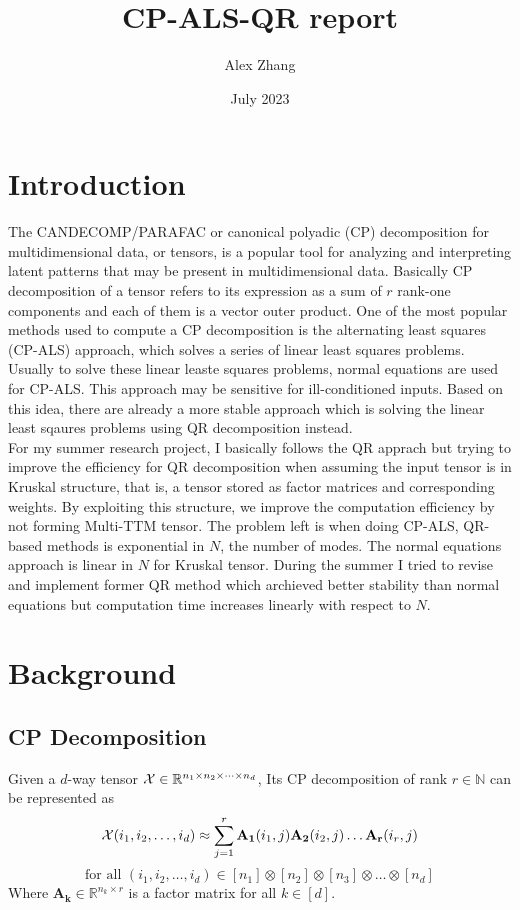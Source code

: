 \documentclass{article}
\title{CP-ALS-QR report}
\author{Alex Zhang}
\date{July 2023}
\newcommand{\mat}[1]{\mathbf{#1}}
\newcommand{\T}[2][]{#1{\mathbf{\cal{#2}}}} 						%
\begin{document}
\maketitle
\section{Introduction}
The CANDECOMP/PARAFAC or canonical polyadic (CP) decomposition for multidimensional data, 
or tensors, is a popular tool for analyzing and interpreting latent patterns that may be 
present in multidimensional data. Basically CP decomposition of a tensor refers to its
expression as a sum of $r$ rank-one components and each of them is a vector outer product.
One of the most popular methods used to compute a CP decomposition is the alternating least
squares (CP-ALS) approach, which solves a series of linear least squares problems. Usually
to solve these linear leaste squares problems, normal equations are used for CP-ALS. This
approach may be sensitive for ill-conditioned inputs. Based on this idea, there are already
a more stable approach which is solving the linear least sqaures problems using QR decomposition
instead.
\\
For my summer research project, I basically follows the QR apprach but trying to 
improve the efficiency for QR decomposition when assuming the input tensor is in Kruskal structure,
that is, a tensor stored as factor matrices and corresponding weights. By exploiting this structure, 
we improve the computation efficiency by not forming Multi-TTM tensor.
The problem left is when doing CP-ALS, QR-based methods is exponential in $N$, the number of modes.
The normal equations approach is linear in $N$ for Kruskal tensor. During the summer I tried
to revise and implement former QR method which archieved better stability than normal equations
but computation time increases linearly with respect to $N$.


\section{Background}
\subsection*{CP Decomposition}
Given a $d$-way tensor $\T{X} \in \mathbb{R}^{n_1\times n_2\times \dots \times n_d}$, Its
CP decomposition of rank $r \in \mathbb{N}$ can be represented as 
$$\T{X}(i_1,i_2,\dots, i_d) \approx \sum^{r}_{j=1}\mat{A_1}(i_1,j)\mat{A_2}(i_2,j) \dots \mat{A_r}(i_r,j)$$
$$\text{for all } (i_1,i_2,\dots, i_d) \in [n_1] \otimes [n_2] \otimes [n_3] \otimes \dots \otimes [n_d]$$
Where $\mat{A_k} \in \mathbb{R}^{n_k \times r}$ is a factor matrix for all $k \in [d]$.
\end{document}
